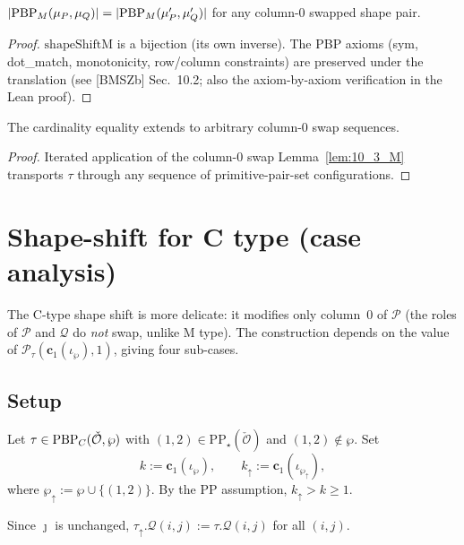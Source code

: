 \begin{lemma}
  \label{lem:10_3_M}
  \leanok
  $|\mathrm{PBP}_M(\mu_P, \mu_Q)| = |\mathrm{PBP}_M(\mu_P', \mu_Q')|$ for any column-0
  swapped shape pair.
\end{lemma}
\begin{proof}
  \leanok
  $\mathrm{shapeShiftM}$ is a bijection (its own inverse). The PBP axioms
  (sym, dot\_match, monotonicity, row/column constraints) are preserved
  under the translation (see [BMSZb] Sec.~10.2; also the axiom-by-axiom
  verification in the Lean proof).
\end{proof}

\begin{proposition}
  \label{prop:10_2_M}
  \leanok
  The cardinality equality extends to arbitrary column-0 swap sequences.
\end{proposition}
\begin{proof}
  \leanok
  Iterated application of the column-0 swap Lemma~\ref{lem:10_3_M} transports $\tau$ through any sequence of primitive-pair-set configurations.
\end{proof}


\section{Shape-shift for C type (case analysis)}

The C-type shape shift is more delicate: it modifies only column~0 of $\mathcal{P}$
(the roles of $\mathcal{P}$ and $\mathcal{Q}$ do \emph{not} swap, unlike M type).
The construction depends on the value of $\mathcal{P}_\tau(\mathbf{c}_1(\iota_\wp), 1)$,
giving four sub-cases.

\subsection{Setup}

Let $\tau \in \mathrm{PBP}_C(\check{\mathcal{O}}, \wp)$ with $(1, 2) \in \mathrm{PP}_\star(\check{\mathcal{O}})$ and $(1, 2) \notin \wp$. Set
\[ k := \mathbf{c}_1(\iota_\wp),\qquad k_\uparrow := \mathbf{c}_1(\iota_{\wp_\uparrow}), \]
where $\wp_\uparrow := \wp \cup \{(1, 2)\}$. By the PP assumption, $k_\uparrow > k \geq 1$.

Since $\jmath$ is unchanged, $\tau_\uparrow.\mathcal{Q}(i, j) := \tau.\mathcal{Q}(i, j)$ for all $(i, j)$.

